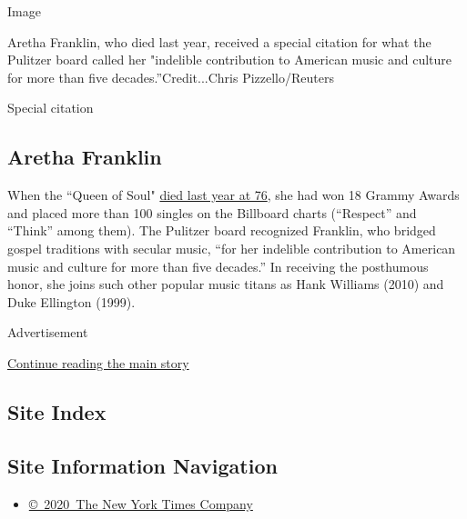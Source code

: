 Image

Aretha Franklin, who died last year, received a special citation for
what the Pulitzer board called her "indelible contribution to American
music and culture for more than five decades.''Credit...Chris
Pizzello/Reuters

Special citation

\hypertarget{aretha-franklin}{%
\subsection{Aretha Franklin}\label{aretha-franklin}}

When the ``Queen of Soul"
\href{https://www.nytimes3xbfgragh.onion/2018/08/16/obituaries/aretha-franklin-dead.html}{died
last year at 76}, she had won 18 Grammy Awards and placed more than 100
singles on the Billboard charts (``Respect'' and ``Think'' among them).
The Pulitzer board recognized Franklin, who bridged gospel traditions
with secular music, ``for her indelible contribution to American music
and culture for more than five decades.'' In receiving the posthumous
honor, she joins such other popular music titans as Hank Williams (2010)
and Duke Ellington (1999).

Advertisement

\protect\hyperlink{after-bottom}{Continue reading the main story}

\hypertarget{site-index}{%
\subsection{Site Index}\label{site-index}}

\hypertarget{site-information-navigation}{%
\subsection{Site Information
Navigation}\label{site-information-navigation}}

\begin{itemize}
\tightlist
\item
  \href{https://help.nytimes3xbfgragh.onion/hc/en-us/articles/115014792127-Copyright-notice}{©~2020~The
  New York Times Company}
\end{itemize}

